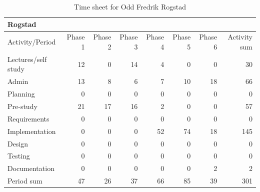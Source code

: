 \documentclass[11pt]{book}
\begin{document}
\begin{table}[H]
\centering
\begin{tabular}{| l | r | r | r | r | r | r | r |}
    \hline
    Rogstad             &          &          &          &          &             &             &              \\ \hline   
    Activity/Period     & Phase 1  & Phase 2  & Phase  3 & Phase 4  & Phase 5     & Phase 6     & Activity sum \\ \hline                     
    Lectures/self study & 12 & 0 & 14 & 4 & 0 & 0 & 30\\ \hline                        
    Admin & 13 & 8 & 6 & 7 & 10 & 18 & 66\\ \hline                        
    Planning & 0 & 0 & 0 & 0 & 0 & 0 & 0\\ \hline                        
    Pre-study & 21 & 17 & 16 & 2 & 0 & 0 & 57\\ \hline                        
    Requirements & 0 & 0 & 0 & 0 & 0 & 0 & 0\\ \hline                        
    Implementation & 0 & 0 & 0 & 52 & 74 & 18 & 145\\ \hline                        
    Design & 0 & 0 & 0 & 0 & 0 & 0 & 0\\ \hline                        
    Testing & 0 & 0 & 0 & 0 & 0 & 0 & 0\\ \hline                        
    Documentation & 0 & 0 & 0 & 0 & 0 & 2 & 2\\ \hline                        
    Period sum & 47 & 26 & 37 & 66 & 85 & 39 & 301\\ \hline                        
\end{tabular}
\caption{Time sheet for Odd Fredrik Rogstad}
\label{tab:appendix_timesheets_odd}
\end{table}
\end{document}
